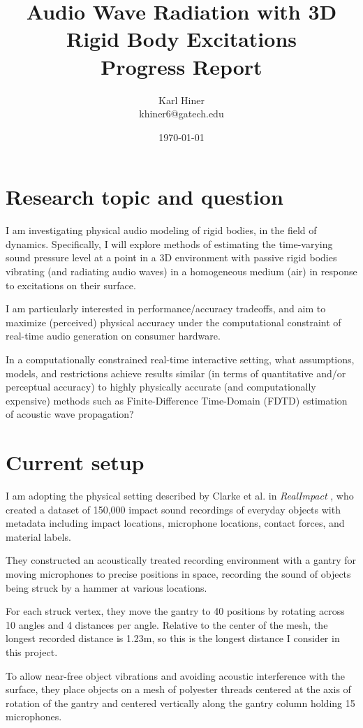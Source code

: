 \documentclass[12pt]{article}
\title{
    Audio Wave Radiation with 3D Rigid Body Excitations\\
    \large Progress Report
}
\author{Karl Hiner\\khiner6@gatech.edu}
\date{\today}
\begin{document}
\maketitle

\section{Research topic and question}

I am investigating physical audio modeling of rigid bodies, in the field of dynamics.
Specifically, I will explore methods of estimating the time-varying sound pressure level at a point in a 3D environment with passive rigid bodies vibrating (and radiating audio waves) in a homogeneous medium (air) in response to excitations on their surface.

I am particularly interested in performance/accuracy tradeoffs, and aim to maximize (perceived) physical accuracy under the computational constraint of real-time audio generation on consumer hardware.

In a computationally constrained real-time interactive setting, what assumptions, models, and restrictions achieve results similar (in terms of quantitative and/or perceptual accuracy) to highly physically accurate (and computationally expensive) methods such as Finite-Difference Time-Domain (FDTD) estimation of acoustic wave propagation?

\section{Current setup}

I am adopting the physical setting described by Clarke et al. in \textit{RealImpact} \cite{clarke_realimpact_2023}, who created a dataset of 150,000 impact sound recordings of everyday objects with metadata including impact locations, microphone locations, contact forces, and material labels.

They constructed an acoustically treated recording environment with a gantry for moving microphones to precise positions in space, recording the sound of objects being struck by a hammer at various locations.

For each struck vertex, they move the gantry to 40 positions by rotating across 10 angles and 4 distances per angle.
Relative to the center of the mesh, the longest recorded distance is 1.23m, so this is the longest distance I consider in this project.

To allow near-free object vibrations and avoiding acoustic interference with the surface, they place objects on a mesh of polyester threads centered at the axis of rotation of the gantry and centered vertically along the gantry column holding 15 microphones.
\end{document}
